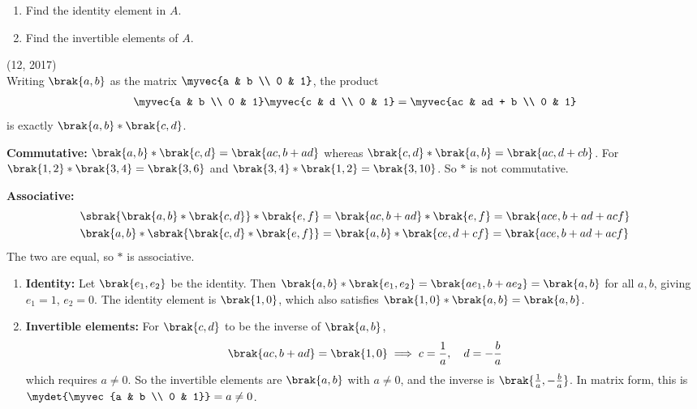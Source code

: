 \begin{enumerate}[label=\thesubsection.\arabic*, ref=\thesubsection.\theenumi]
\begin{enumerate}
	\item Find the identity element in $A$.
	\item Find the invertible elements of $A$.
\end{enumerate}
\hfill (12, 2017)
\\
\solution
Writing $\brak{a, b}$ as the matrix $\myvec{a & b \\ 0 & 1}$, the product
\begin{align}
	\myvec{a & b \\ 0 & 1}\myvec{c & d \\ 0 & 1} = \myvec{ac & ad + b \\ 0 & 1}
\end{align}
is exactly $\brak{a, b} * \brak{c, d}$.

\noindent \textbf{Commutative:} $\brak{a, b} * \brak{c, d} = \brak{ac, b + ad}$ whereas $\brak{c, d} * \brak{a, b} = \brak{ac, d + cb}$. For $\brak{1, 2} * \brak{3, 4} = \brak{3, 6}$ and $\brak{3, 4} * \brak{1, 2} = \brak{3, 10}$. So $*$ is not commutative.

\noindent \textbf{Associative:}
\begin{align}
	\sbrak{\brak{a, b} * \brak{c, d}} * \brak{e, f} &= \brak{ac, b + ad} * \brak{e, f} = \brak{ace, b + ad + acf}
	\\
	\brak{a, b} * \sbrak{\brak{c, d} * \brak{e, f}} &= \brak{a, b} * \brak{ce, d + cf} = \brak{ace, b + ad + acf}
\end{align}
The two are equal, so $*$ is associative.

\begin{enumerate}
\item \textbf{Identity:} Let $\brak{e_1, e_2}$ be the identity. Then $\brak{a, b} * \brak{e_1, e_2} = \brak{ae_1, b + ae_2} = \brak{a, b}$ for all $a, b$, giving $e_1 = 1$, $e_2 = 0$. The identity element is $\brak{1, 0}$, which also satisfies $\brak{1, 0} * \brak{a, b} = \brak{a, b}$.
\item \textbf{Invertible elements:} For $\brak{c, d}$ to be the inverse of $\brak{a, b}$,
\begin{align}
	\brak{ac, b + ad} = \brak{1, 0} \implies c = \frac{1}{a}, \quad d = -\frac{b}{a}
\end{align}
which requires $a \neq 0$. So the invertible elements are $\brak{a, b}$ with $a \neq 0$, and the inverse is $\brak{\frac{1}{a}, -\frac{b}{a}}$. In matrix form, this is $\mydet{\myvec{a & b \\ 0 & 1}} = a \neq 0$.
\end{enumerate}


\end{enumerate}
